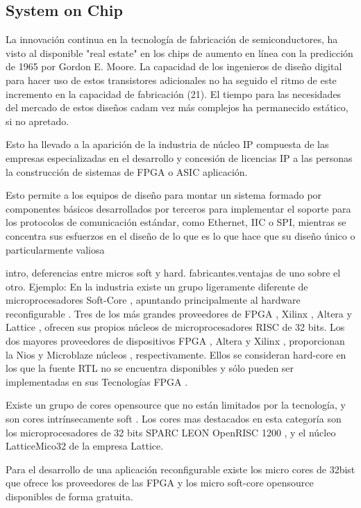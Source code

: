 \documentclass[a4paper,11pt]{article}
\begin{document}
\subsection{System on Chip}

La innovación continua en la tecnología de fabricación de semiconductores, ha visto al
disponible "real estate" en los chips de aumento en línea con la predicción de 1965 por Gordon E. Moore. La capacidad de los ingenieros de diseño digital para hacer uso de estos transistores adicionales no ha seguido el ritmo de este incremento en la capacidad de fabricación (21). El tiempo para las necesidades del mercado de estos diseños cadam vez más complejos ha permanecido estático, si no apretado.

Esto ha llevado a la aparición de la industria de núcleo IP compuesta de las empresas especializadas en el desarrollo y concesión de licencias IP a las personas la construcción de sistemas de FPGA o ASIC aplicación.

Esto permite a los equipos de diseño para montar un sistema formado por componentes básicos desarrollados por terceros para implementar el soporte para los protocolos de comunicación estándar, como Ethernet, IIC o SPI, mientras se concentra sus esfuerzos en el diseño de lo que es lo que hace que su diseño único o
particularmente valiosa


 intro,  deferencias entre micros soft y hard. fabricantes.ventajas de uno sobre el otro.
 Ejemplo:
En la industria existe un grupo ligeramente diferente de microprocesadores  Soft-Core , apuntando principalmente al hardware reconfigurable . Tres de los más grandes proveedores de FPGA , Xilinx , Altera y Lattice , ofrecen sus propios núcleos de microprocesadores RISC de 32 bits. Los dos mayores proveedores de dispositivos FPGA , Altera y Xilinx , proporcionan la Nios y Microblaze núcleos , respectivamente. Ellos se consideran hard-core en los que la fuente RTL no se encuentra  disponibles y sólo pueden ser implementadas en sus  Tecnologías FPGA .

Existe un grupo de cores opensource que no están limitados por la tecnología, y
son cores intrínsecamente soft . Los cores mas destacados en esta categoría son los  microprocesadores de 32 bits  SPARC LEON OpenRISC 1200 , y el núcleo LatticeMico32 de la empresa Lattice.

Para el desarrollo de una aplicación reconfigurable existe los micro cores de 32bist que ofrece los proveedores de las FPGA y los micro soft-core opensource disponibles de forma gratuita.
\end{document}
